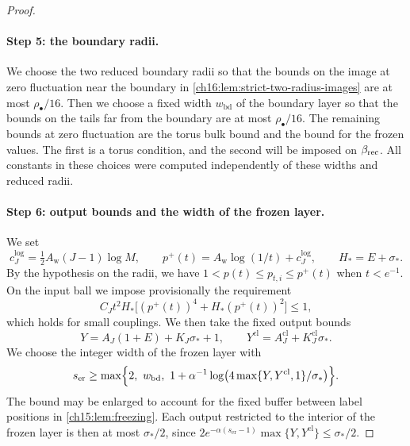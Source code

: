 \begin{proof}
\paragraph{Step 5: the boundary radii.}
We choose the two reduced boundary radii so that the bounds on the image at zero fluctuation near the boundary in \cref{ch16:lem:strict-two-radius-images} are at most $\rho_\bullet/16$. Then we choose a fixed width $w_{\mathrm{bd}}$ of the boundary layer so that the bounds on the tails far from the boundary are at most $\rho_\bullet/16$. The remaining bounds at zero fluctuation are the torus bulk bound and the bound for the frozen values. The first is a torus condition, and the second will be imposed on $\beta_{\mathrm{rec}}$. All constants in these choices were computed independently of these widths and reduced radii.

\paragraph{Step 6: output bounds and the width of the frozen layer.}
We set
\begin{equation}\label{ch17:eq:logarithmic-envelope}
 c_J^{\log}=\tfrac12A_{\mathrm w}(J-1)\log M,\qquad p^+(t)=A_{\mathrm w}\log(1/t)+c_J^{\log},\qquad H_*=E+\sigma_*.
\end{equation}
By the hypothesis on the radii, we have $1<p(t)\le p_{t,i}\le p^+(t)$ when $t<e^{-1}$. On the input ball we impose provisionally the requirement
\[
 C_Jt^2H_*\bigl[(p^+(t))^4+H_*(p^+(t))^2\bigr]\le1,
\]
which holds for small couplings. We then take the fixed output bounds
\[
 Y=A_J(1+E)+K_J\sigma_*+1,\qquad Y^{\mathrm{cl}}=A_J^{\mathrm{cl}}+K_J^{\mathrm{cl}}\sigma_*.
\]
We choose the integer width of the frozen layer with
\[
 s_{\mathrm{er}}\ge\max\Bigl\{2,\ w_{\mathrm{bd}},\ 1+\alpha^{-1}\log\bigl(4\max\{Y,Y^{\mathrm{cl}},1\}/\sigma_*\bigr)\Bigr\}.
\]
The bound may be enlarged to account for the fixed buffer between label positions in \cref{ch15:lem:freezing}. Each output restricted to the interior of the frozen layer is then at most $\sigma_*/2$, since $2e^{-\alpha(s_{\mathrm{er}}-1)}\max\{Y,Y^{\mathrm{cl}}\}\le\sigma_*/2$.


\end{proof}
